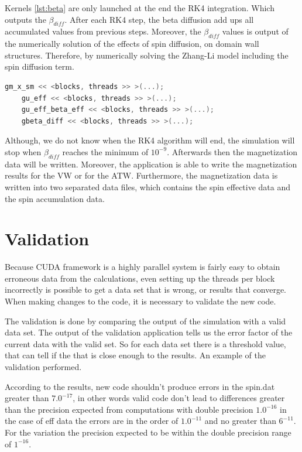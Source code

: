 Kernels \ref{lst:beta} are only launched at the end the RK4 integration. Which outputs the $\beta_{diff}$. After each RK4 step, the beta diffusion add ups all accumulated values from previous steps. Moreover, the $\beta_{diff}$ values is output of the numerically solution of the effects of spin diffusion, on domain wall structures. Therefore, by numerically solving the Zhang-Li model including the spin diffusion term.

\begin{lstlisting}[language=C++, label={lst:beta}, caption={Calculate beta diffusion }]
    gm_x_sm << <blocks, threads >> >(...); 
    gu_eff << <blocks, threads >> >(...); 
    gu_eff_beta_eff << <blocks, threads >> >(...); 	
    gbeta_diff << <blocks, threads >> >(...);               
\end{lstlisting}

Although, we do not know when the RK4 algorithm will end, the simulation will stop when $\beta_{diff}$ reaches the minimum of $10^{-9}$. Afterwards then the magnetization data will be written. Moreover, the application is able to write the magnetization results for the VW or for the ATW. Furthermore, the magnetization data is written into two separated data files, which contains the spin effective data and the spin accumulation data.

\section{Validation}

Because CUDA framework is a highly parallel system is fairly easy to obtain erroneous data from the calculations, even setting up the threads per block incorrectly is possible to get a data set that is wrong, or results that converge. When making changes to the code, it is necessary to validate the new code.

The validation is done by comparing the output of the simulation with a valid data set. The output of the validation application tells us the error factor of the current data with the valid set. So for each data set there is a threshold value, that can tell if the that is close enough to the results. An example of the validation performed.

According to the results, new code shouldn't produce errors in the spin.dat greater than $7.0^{-17}$, in other words valid code don't lead to differences greater than the precision expected from computations with double precision $1.0^{-16}$ in the case of eff data the errors are in the order of $1.0^{-11}$ and no greater than $6^{-11}$. For the variation the precision expected to be within the double precision range of $1^{-16}$. 

